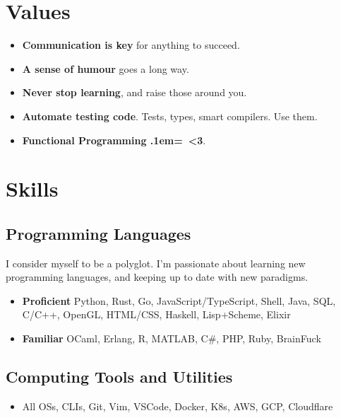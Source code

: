 \documentclass{jcgcv}
\begin{document}
\begin{column}
\end{column}\begin{column}

  \section{Values}
  \begin{itemize}
    \item \textbf{Communication is key} for anything to succeed.
    \item \textbf{A sense of humour} goes a long way.
    \item \textbf{Never stop learning}, and raise those around you.
    \item \textbf{Automate testing code}. Tests, types, smart compilers. Use them.
    \item \textbf{Functional Programming {\raise.1em\hbox{= <}}3}.
  \end{itemize}

  \section{Skills}
  \subsection{Programming Languages}
    I consider myself to be a polyglot. I'm passionate about learning
    new programming languages, and keeping up to date with new paradigms.
  \begin{itemize}
    \item \textbf{Proficient} Python, Rust, Go, JavaScript/TypeScript, Shell, Java,
          SQL, C/C++, OpenGL, HTML/CSS, Haskell, Lisp+Scheme, Elixir
    \item \textbf{Familiar} OCaml, Erlang, R, MATLAB, C\#, PHP, Ruby, BrainFuck
  \end{itemize}
  \subsection{Computing Tools and Utilities}
  \begin{itemize}
    \item All OSs, CLIs, Git, Vim, VSCode, Docker, K8s, AWS, GCP, Cloudflare
  \end{itemize}


\end{column}
\end{document}
